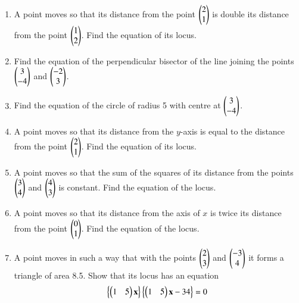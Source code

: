 \renewcommand{\theequation}{\theenumi}

\begin{enumerate}[label=\arabic*.,ref=\thesubsection.\theenumi]
\item A point moves so that its distance from the point $\begin{pmatrix}2\\1\end{pmatrix}$ is double its distance from the point $\begin{pmatrix}1\\2\end{pmatrix}$.  Find
the equation of its locus.
\item Find the equation of the perpendicular bisector of the line joining the points $\begin{pmatrix}3\\-4\end{pmatrix}$ and $\begin{pmatrix}-2\\3\end{pmatrix}$.
\item Find the equation of the circle of radius 5 with centre at $\begin{pmatrix}3\\-4\end{pmatrix}$.
\item A point moves so that its distance from the $y$-axis is equal to the distance from the point $\begin{pmatrix}2\\1\end{pmatrix}$. Find the equation of its locus.
\\
\solution

\item  A point moves so that the sum of the squares of its distance from the points $\begin{pmatrix}3\\4\end{pmatrix}$ and $\begin{pmatrix}4\\3\end{pmatrix}$ is constant.  Find the equation of the
locus.
\item A point moves so that its distance from the axis of $x$ is twice its distance from the point $\begin{pmatrix}0\\1\end{pmatrix}$.  Find the equation of the locus.
\item A point moves in such a way that with the points $\begin{pmatrix}2\\3\end{pmatrix}$ and $\begin{pmatrix}-3\\4\end{pmatrix}$ it forms a triangle of area 8.5.  Show that its locus has an equation
\begin{equation}
\left\{\begin{pmatrix}1 & 5\end{pmatrix}\mathbf{x}\right\}\left\{\begin{pmatrix}1 & 5\end{pmatrix}\mathbf{x}-34\right\} = 0
\end{equation}


\end{enumerate}
